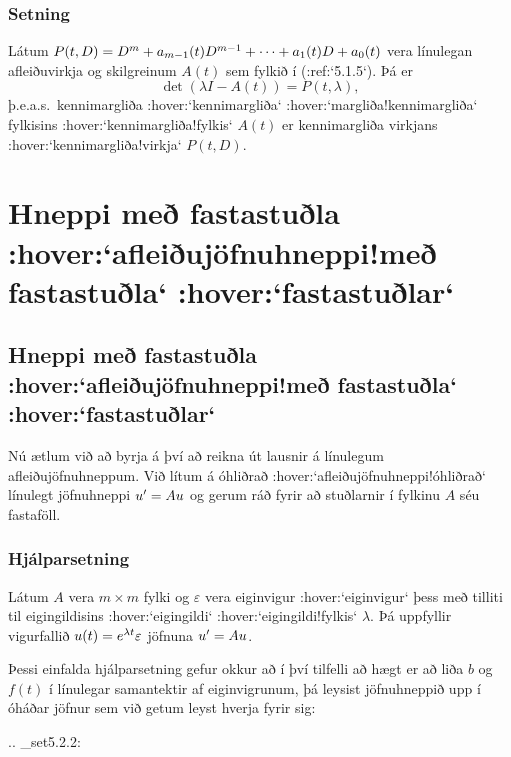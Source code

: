 \subsubsection{Setning} Látum  $P(t,D)=D\sp m+a_{m-1}(t)D\sp{m-1}+\cdots+a_1(t)D+a_0(t)$
vera línulegan afleiðuvirkja og skilgreinum $A(t)$ sem fylkið í
(:ref:`5.1.5`).  Þá er
$$\det(\lambda I-A(t))=P(t,\lambda),$$
þ.e.a.s.~kennimargliða :hover:`kennimargliða` :hover:`margliða!kennimargliða`
fylkisins :hover:`kennimargliða!fylkis` $A(t)$ er kennimargliða
virkjans :hover:`kennimargliða!virkja` $P(t,D)$.




\section{Hneppi með fastastuðla :hover:`afleiðujöfnuhneppi!með
fastastuðla` :hover:`fastastuðlar`}

\subsection{Hneppi með fastastuðla :hover:`afleiðujöfnuhneppi!með
fastastuðla` :hover:`fastastuðlar`}

\noindent
Nú ætlum við að byrja á því að reikna út lausnir á línulegum
afleiðujöfnuhneppum.
Við lítum á óhliðrað :hover:`afleiðujöfnuhneppi!óhliðrað`
línulegt jöfnuhneppi $u{\sp{\prime}}=Au$ og gerum ráð fyrir að stuðlarnir
í fylkinu $A$  séu fastaföll.

\subsubsection{Hjálparsetning}
Látum $A$ vera $m\times m$ fylki og $\varepsilon$ vera
eiginvigur :hover:`eiginvigur` þess með
tilliti til eigingildisins :hover:`eigingildi` :hover:`eigingildi!fylkis`
$\lambda$. Þá uppfyllir vigurfallið
$u(t)=e\sp{\lambda t}\varepsilon$ jöfnuna $u{\sp{\prime}}=Au$.

{}


Þessi einfalda hjálparsetning gefur okkur að í því tilfelli að hægt er
að liða $b$ og $f(t)$ í línulegar samantektir af eiginvigrunum, þá
leysist jöfnuhneppið  upp í óháðar jöfnur sem við getum leyst hverja
fyrir sig:


.. _set5.2.2:

